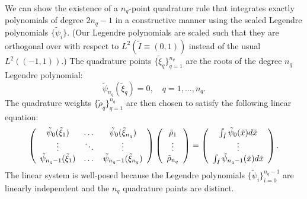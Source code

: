 We can show the existence of a $n_q$-point quadrature rule that integrates exactly polynomials of degree $2n_q-1$ in a constructive manner using the scaled Legendre polynomials $\{ \tilde \psi_i \}$. (Our Legendre polynomials are scaled such that they are orthogonal over with respect to $L^2(\tilde I \equiv (0,1))$ instead of the usual $L^2((-1,1))$.) The quadrature points $\{ \tilde \xi_q \}_{q=1}^{n_q}$ are the roots of the degree $n_q$ Legendre polynomial:
\begin{equation}
  \tilde \psi_{n_q}(\tilde \xi_q) = 0, \quad q = 1,\dots,n_q.
  \label{eq:fe_impl_gauss_points}
\end{equation}
The quadrature weights $\{\tilde \rho_q \}_{q=1}^{n_q}$ are then chosen to satisfy the following linear equation:
\begin{equation}
  \bmat{ccc}
  \tilde \psi_0(\tilde \xi_1) & \dots & \tilde \psi_0(\tilde \xi_{n_q}) \\
  \vdots & \ddots & \vdots \\
  \tilde \psi_{n_q-1}(\tilde \xi_1) & \dots & \tilde \psi_{n_q-1}(\tilde \xi_{n_q}) 
  \emat
  \bmat{c}
  \tilde \rho_1 \\ \vdots \\ \tilde \rho_{n_q}
  \emat
  =
  \bmat{c}
  \int_{\tilde I} \tilde \psi_0(\tilde x) d\tilde x \\
  \vdots \\
  \int_{\tilde I} \tilde \psi_{n_q-1}(\tilde x) d\tilde x
  \emat .
  \label{eq:fe_impl_gauss_weights}
\end{equation}
The linear system is well-posed because the Legendre polynomials $\{ \tilde \psi_i \}_{i=0}^{n_q-1}$ are linearly independent and the $n_q$ quadrature points are distinct.

